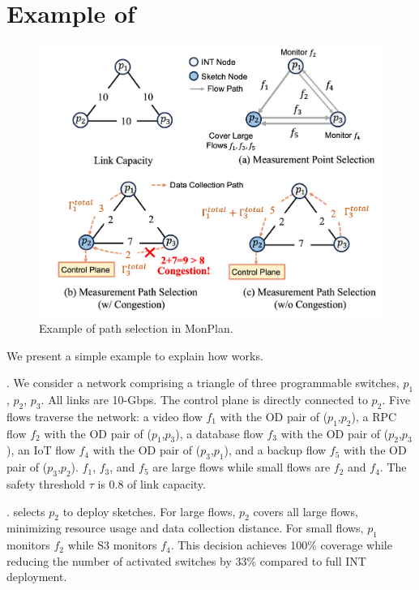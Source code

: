 \section{Example of \sysname}

\begin{figure}
    \centering
    \includegraphics[width=\linewidth]{pics/example.png}
    \caption{Example of path selection in MonPlan.}
    \label{example}
\end{figure}

We present a simple example to explain how \sysname works. 

. We consider a network comprising a triangle of three programmable switches, $p_1$, $p_2$, $p_3$. All links are 10-Gbps. The control plane is directly connected to $p_2$. Five flows traverse the network: a video flow $f_1$ with the OD pair of ($p_1$,$p_2$), a RPC flow $f_2$ with the OD pair of ($p_1$,$p_3$), a database flow $f_3$ with the OD pair of ($p_2$,$p_3$), an IoT flow $f_4$ with the OD pair of ($p_3$,$p_1$), and a backup flow $f_5$ with the OD pair of ($p_3$,$p_2$). $f_1$, $f_3$, and $f_5$ are large flows while small flows are $f_2$ and $f_4$. The safety threshold $\tau$ is 0.8 of link capacity. 

. \sysname selects $p_2$ to deploy sketches. For large flows, $p_2$ covers all large flows, minimizing resource usage and data collection distance. For small flows, $p_1$ monitors $f_2$ while S3 monitors $f_4$. This decision achieves 100\% coverage while reducing the number of activated switches by 33\% compared to full INT deployment. 

